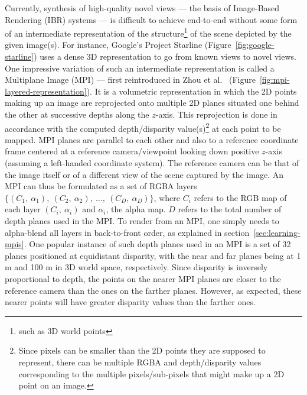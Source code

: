 Currently, synthesis of high-quality novel views --- the basis of Image-Based Rendering (IBR) systems --- is difficult to achieve end-to-end without some form of an intermediate representation of the structure\footnote{such as 3D world points} of the scene depicted by the given image(s). For instance, Google's Project Starline (Figure~\ref{fig:google-starline}) uses a dense 3D representation to go from known views to novel views. One impressive variation of such an intermediate representation is called a Multiplane Image (MPI) --- first reintroduced in Zhou et al.~\cite{zhou2018stereo} (Figure~\ref{fig:mpi-layered-representation}). It is a volumetric representation in which the 2D points making up an image are reprojected onto multiple 2D planes situated one behind the other at successive depths along the $z$-axis. This reprojection is done in accordance with the computed depth/disparity value(s)\footnote{Since pixels can be smaller than the 2D points they are supposed to represent, there can be multiple RGBA and depth/disparity values corresponding to the multiple pixels/sub-pixels that might make up a 2D point on an image.} at each point to be mapped. MPI planes are parallel to each other and also to a reference coordinate frame centered at a reference camera/viewpoint looking down positive $z$-axis (assuming a left-handed coordinate system). The reference camera can be that of the image itself or of a different view of the scene captured by the image. An MPI can thus be formulated as a set of RGBA layers $\{(C_1,\ \alpha_1),\ (C_2,\ \alpha_2),\ \ldots,\ (C_D,\ \alpha_D)\}$, where $C_i$ refers to the RGB map of each layer $(C_i,\ \alpha_i)$ and $\alpha_i$, the alpha map. $D$ refers to the total number of depth planes used in the MPI. To render from an MPI, one simply needs to alpha-blend all layers in back-to-front order, as explained in section~\ref{sec:learning-mpis}. One popular instance of such depth planes used in an MPI is a set of 32 planes positioned at equidistant disparity, with the near and far planes being at 1 m and 100 m in 3D world space, respectively. Since disparity is inversely proportional to depth, the points on the nearer MPI planes are closer to the reference camera than the ones on the farther planes. However, as expected, these nearer points will have greater disparity values than the farther ones.


